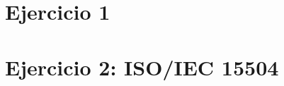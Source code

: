 

\section{Ejercicio 1}\label{sec:intro-ej1}



\section{Ejercicio 2: ISO/IEC 15504}\label{sec:intro-ej2}
